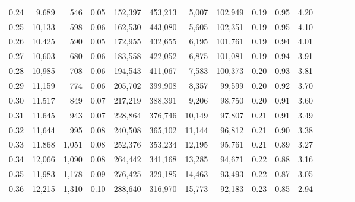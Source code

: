 \begin{tabular}{rrrcrrrrrrrrrrr}
0.24 &   9,689 &    546 &                                       0.05 &  152,397 &  453,213 &    5,007 &  102,949 &  0.19 &  0.95 &                         4.20 \\
0.25 &  10,133 &    598 &                                       0.06 &  162,530 &  443,080 &    5,605 &  102,351 &  0.19 &  0.95 &                         4.10 \\
0.26 &  10,425 &    590 &                                       0.05 &  172,955 &  432,655 &    6,195 &  101,761 &  0.19 &  0.94 &                         4.01 \\
0.27 &  10,603 &    680 &                                       0.06 &  183,558 &  422,052 &    6,875 &  101,081 &  0.19 &  0.94 &                         3.91 \\
0.28 &  10,985 &    708 &                                       0.06 &  194,543 &  411,067 &    7,583 &  100,373 &  0.20 &  0.93 &                         3.81 \\
0.29 &  11,159 &    774 &                                       0.06 &  205,702 &  399,908 &    8,357 &   99,599 &  0.20 &  0.92 &                         3.70 \\
0.30 &  11,517 &    849 &                                       0.07 &  217,219 &  388,391 &    9,206 &   98,750 &  0.20 &  0.91 &                         3.60 \\
0.31 &  11,645 &    943 &                                       0.07 &  228,864 &  376,746 &   10,149 &   97,807 &  0.21 &  0.91 &                         3.49 \\
0.32 &  11,644 &    995 &                                       0.08 &  240,508 &  365,102 &   11,144 &   96,812 &  0.21 &  0.90 &                         3.38 \\
0.33 &  11,868 &  1,051 &                                       0.08 &  252,376 &  353,234 &   12,195 &   95,761 &  0.21 &  0.89 &                         3.27 \\
0.34 &  12,066 &  1,090 &                                       0.08 &  264,442 &  341,168 &   13,285 &   94,671 &  0.22 &  0.88 &                         3.16 \\
0.35 &  11,983 &  1,178 &                                       0.09 &  276,425 &  329,185 &   14,463 &   93,493 &  0.22 &  0.87 &                         3.05 \\
0.36 &  12,215 &  1,310 &                                       0.10 &  288,640 &  316,970 &   15,773 &   92,183 &  0.23 &  0.85 &                         2.94 \\

\end{tabular}
